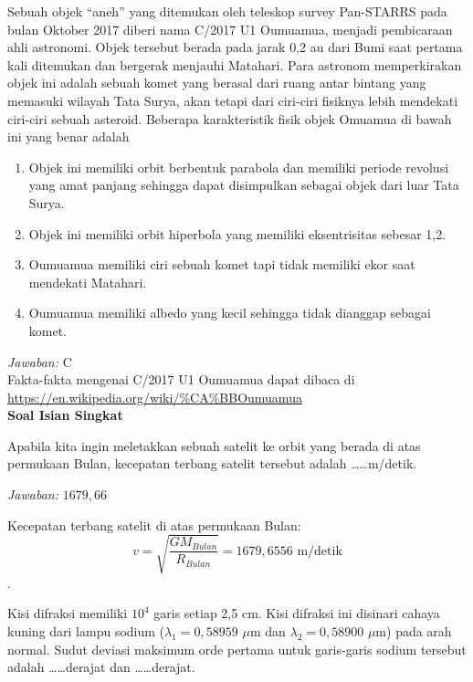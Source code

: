 \documentclass[11pt,fleqn]{exam}
\begin{document}
\begin{questions}
\question Sebuah objek ``aneh'' yang ditemukan oleh teleskop survey Pan-STARRS pada bulan Oktober 2017 diberi nama C/2017 U1 Oumuamua, menjadi pembicaraan ahli astronomi. Objek tersebut berada pada jarak 0,2 au dari Bumi saat pertama kali ditemukan dan bergerak menjauhi Matahari. Para astronom memperkirakan objek ini adalah sebuah komet yang berasal dari ruang antar bintang yang memasuki wilayah Tata Surya, akan tetapi dari ciri-ciri fisiknya lebih mendekati ciri-ciri sebuah asteroid. Beberapa karakteristik fisik objek Omuamua di bawah ini yang benar adalah
\begin{enumerate}
\item Objek ini memiliki orbit berbentuk parabola dan memiliki periode revolusi yang amat panjang sehingga dapat disimpulkan sebagai objek dari luar Tata Surya.
\item Objek ini memiliki orbit hiperbola yang memiliki eksentrisitas sebesar 1,2.
\item Oumuamua memiliki ciri sebuah komet tapi tidak memiliki ekor saat mendekati Matahari.
\item Oumuamua memiliki albedo yang kecil sehingga tidak dianggap sebagai komet.
\end{enumerate}

\textit{Jawaban: } C\\

Fakta-fakta mengenai C/2017 U1 Oumuamua dapat dibaca di \url{https://en.wikipedia.org/wiki/\%CA\%BBOumuamua}\\





\vspace{0.5cm}
\textbf{Soal Isian Singkat}

\question Apabila kita ingin meletakkan sebuah satelit ke orbit yang berada di atas permukaan Bulan, kecepatan terbang satelit tersebut adalah \ldots\ldots m/detik.

\textit{Jawaban:} $1679,66$

Kecepatan terbang satelit di atas permukaan Bulan: 
$$v=\sqrt{\frac{GM_{Bulan}}{R_{Bulan}}} = 1679,6556 \text{ m/detik}$$.



\question Kisi difraksi memiliki $10^4$ garis setiap 2,5 cm. Kisi difraksi ini disinari cahaya kuning dari lampu sodium ($\lambda_1=0,58959$ $\mu$m dan $\lambda_2=0,58900$ $\mu$m) pada arah normal. Sudut deviasi maksimum orde pertama untuk garis-garis sodium tersebut adalah \ldots\ldots derajat dan \ldots\ldots derajat.


\end{questions}
\end{document}
